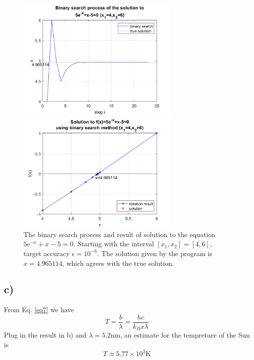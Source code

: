 \documentclass[12pt, graphicx]{article}
\begin{document}
\begin{figure}[ht]
\begin{minipage}{0.48\linewidth}
\centering
\includegraphics[width = 80mm]{binary_search.png}
\end{minipage}
\begin{minipage}{0.48\linewidth}
\centering
\includegraphics[width = 80mm]{binary_result.png}
\end{minipage}
\caption{The binary search process and result of solution to the equation $5\mathrm{e}^{-x}+x-5=0$. Starting with the interval $[x_1,x_2]=[4,6]$, target accuracy $\epsilon=10^{-6}$. The solution given by the program is $x=4.965114$, which agrees with the true solution.}
\label{fig:bin}
\end{figure}

\subsection*{c)}
From Eq. \ref{eq7} we have 
\begin{equation}
T=\frac{b}{\lambda}=\frac{hc}{k_Bx\lambda}
\end{equation}
Plug in the result in b) and $\lambda=5.2\mathrm{nm}$, an estimate for the tempreture of the Sun is 
\begin{equation}
T\approx5.77\times10^3\mathrm{K}
\end{equation}
\end{document}
